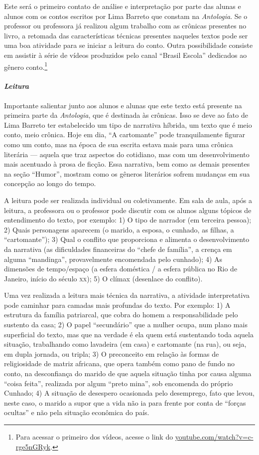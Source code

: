 \documentclass[11pt]{extarticle}
\begin{document}
Este será o primeiro contato de análise e interpretação por parte das
alunas e alunos com os contos escritos por Lima Barreto que constam na
\emph{Antologia}. Se o professor ou professora já realizou algum
trabalho com as crônicas presentes no livro, a retomada das
características técnicas presentes naqueles textos pode ser uma boa
atividade para se iniciar a leitura do conto. Outra possibilidade
consiste em assistir à série de vídeos produzidos pelo canal ``Brasil
Escola'' dedicados ao gênero conto.\footnote{Para acessar o primeiro dos
  vídeos, acesse o link do
  \href{https://www.youtube.com/watch?v=c-rge5nGRyk}{youtube.com/watch?v=c-rge5nGRyk}.}

\paragraph{\textit{Leitura}}

Importante salientar junto aos alunos e alunas que este texto está
presente na primeira parte da \emph{Antologia}, que é destinada às
crônicas. Isso se deve ao fato de Lima Barreto ter estabelecido um tipo
de narrativa híbrida, um texto que é meio conto, meio crônica. Hoje em
dia, ``A cartomante'' pode tranquilamente figurar como um
conto, mas na época de sua escrita estava mais para uma crônica
literária --- aquela que traz aspectos do cotidiano, mas com um
desenvolvimento mais acentuado à prosa de ficção. Essa narrativa, bem
como as demais presentes na seção ``Humor'', mostram como os gêneros
literários sofrem mudanças em sua concepção ao longo do tempo.

A leitura pode ser realizada individual ou coletivamente. Em sala de
aula, após a leitura, a professora ou o professor pode discutir com os
alunos alguns tópicos de entendimento do texto, por exemplo: 1) O tipo de
narrador (em terceira pessoa); 2) Quais personagens aparecem (o marido,
a esposa, o cunhado, as filhas, a ``cartomante''); 3) Qual o conflito
que proporciona e alimenta o desenvolvimento da narrativa (as
dificuldades financeiras do ``chefe de família'', a crença em alguma
``mandinga'', provavelmente encomendada pelo cunhado); 4) As dimensões
de tempo/espaço (a esfera doméstica / a esfera pública no Rio de
Janeiro, início do século \textsc{xx}); 5) O clímax (desenlace do conflito).

Uma vez realizada a leitura mais técnica da narrativa, a atividade
interpretativa pode caminhar para camadas mais profundas do texto. Por
exemplo: 1) A estrutura da família patriarcal, que cobra do homem a
responsabilidade pelo sustento da casa; 2) O papel ``secundário'' que a
mulher ocupa, num plano mais superficial do texto, mas que na verdade é
ela quem está sustentando toda aquela situação, trabalhando como
lavadeira (em casa) e cartomante (na rua), ou seja, em dupla jornada, ou
tripla; 3) O preconceito em relação às formas de religiosidade de matriz
africana, que opera também como pano de fundo no conto, na desconfiança
do marido de que aquela situação tinha por causa alguma ``coisa feita'',
realizada por algum ``preto mina'', sob encomenda do próprio Cunhado; 4)
A situação de desespero ocasionada pelo desemprego, fato que levou,
neste caso, o marido a supor que a vida não ia para frente por conta de
``forças ocultas'' e não pela situação econômica do país.
\end{document}

